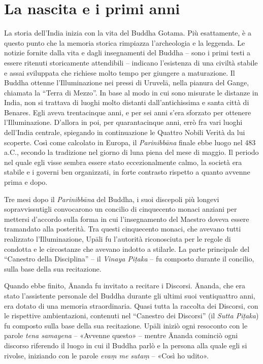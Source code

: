 \chapter{La nascita e i primi anni}

 La storia dell’India inizia con la vita del Buddha
Gotama. Più esattamente, è a questo punto che la memoria storica rimpiazza
l’archeologia e la leggenda. Le notizie fornite dalla vita e dagli insegnamenti
del Buddha – sono i primi testi a essere ritenuti storicamente attendibili –
indicano l’esistenza di una civiltà stabile e assai sviluppata che richiese
molto tempo per giungere a maturazione. Il Buddha ottenne l’Illuminazione nei
pressi di Uruvelā, nella pianura del Gange, chiamata la “Terra di Mezzo”. In
base al modo in cui sono misurate le distanze in India, non si trattava di
luoghi molto distanti dall’antichissima e santa città di Benares. Egli aveva
trentacinque anni, e per sei anni s’era sforzato per ottenere l’Illuminazione.
D’allora in poi, per quarantacinque anni, errò fra vari luoghi dell’India
centrale, spiegando in continuazione le Quattro Nobili Verità da lui scoperte.
Così come calcolato in Europa, il \emph{Parinibbāna} finale ebbe luogo nel 483
a.C., secondo la tradizione nel giorno di luna piena del mese di maggio. Il
periodo nel quale egli visse sembra essere stato eccezionalmente calmo, la
società era stabile e i governi ben organizzati, in forte contrasto rispetto a
quanto avvenne prima e dopo.

 Tre mesi dopo il \emph{Parinibbāna} del Buddha, i
suoi discepoli più longevi sopravvissutigli convocarono un concilio di
cinquecento monaci anziani per mettersi d’accordo sulla forma in cui
l’insegnamento del Maestro doveva essere tramandato alla posterità. Tra questi
cinquecento monaci, che avevano tutti realizzato l’Illuminazione, Upāli fu
l’autorità riconosciuta per le regole di condotta e le circostanze che avevano
indotto a stilarle. La parte principale del “Canestro della Disciplina” – il
\emph{Vinaya Piṭaka} – fu composto durante il concilio, sulla base della sua
recitazione.

Quando ebbe finito, Ānanda fu invitato a recitare i Discorsi. Ānanda, che era
stato l’assistente personale del Buddha durante gli ultimi suoi ventiquattro
anni, era dotato di una memoria straordinaria. Quasi tutta la raccolta dei
Discorsi, con le rispettive ambientazioni, contenuti nel “Canestro dei Discorsi”
(il \emph{Sutta Piṭaka}) fu composto sulla base della sua recitazione. Upāli
iniziò ogni resoconto con le parole \emph{tena samayena} – «Avvenne questo» –
mentre Ānanda cominciò ogni discorso riferendo il luogo in cui il Buddha parlò e
la persona alla quale egli si rivolse, iniziando con le parole \emph{evaṃ me
  sutaṃ} – «Così ho udito».


